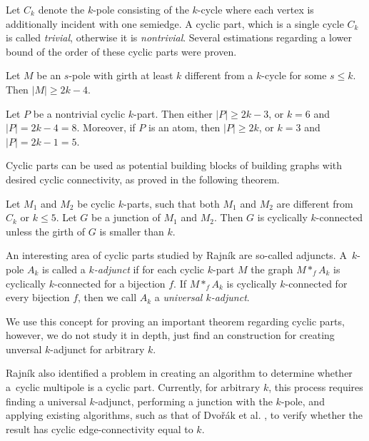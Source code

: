 \documentclass[12pt, twoside]{book}
\begin{document}
Let $C_k$ denote the $k$-pole consisting of the $k$-cycle where each vertex is additionally incident with one semiedge. A cyclic part, which is a single cycle $C_k$ is called \textit{trivial}, otherwise it is \textit{nontrivial}. Several estimations regarding a lower bound of the order of these cyclic parts were proven.

\begin{lemma}\label{lem:rajnik5.1}
	Let $M$ be an $s$-pole with girth at least $k$ different from a $k$-cycle for some $s\leq k$. Then $|M| \geq 2k - 4$.
\end{lemma}

\begin{theorem}
	Let $P$ be a nontrivial cyclic $k$-part. Then either $|P|\geq 2k-3$, or $k = 6$ and $|P|= 2k-4 = 8$. Moreover, if $P$ is an atom, then $|P| \geq 2k$, or $k = 3$ and $|P| = 2k-1 = 5$.
\end{theorem}

Cyclic parts can be used as potential building blocks of building graphs with desired cyclic connectivity, as proved in the following theorem.

\begin{theorem}
	Let $M_1$ and $M_2$ be cyclic $k$-parts, such that both $M_1$ and $M_2$ are diﬀerent from $C_k$ or $k\leq 5$. Let $G$ be a junction of $M_1$ and $M_2$. Then $G$ is cyclically $k$-connected unless the girth of $G$ is smaller than $k$.
\end{theorem}

An interesting area of cyclic parts studied by Rajník \cite{Rajnik_phd} are so-called adjuncts. A~$k$-pole $A_k$ is called a \textit{$k$-adjunct} if for each cyclic $k$-part $M$ the graph $M*_f A_k$ is cyclically $k$-connected for a bijection $f$. If $M*_f A_k$ is cyclically $k$-connected for every bijection $f$, then we call $A_k$ a \emph{universal $k$-adjunct}.

We use this concept for proving an important theorem regarding cyclic parts, however, we do not study it in depth, just find an construction for creating unversal $k$-adjunct for arbitrary $k$.

Rajník \cite{Rajnik_phd} also identified a problem in creating an algorithm to determine whether a~cyclic multipole is a cyclic part. Currently, for arbitrary $k$, this process requires finding a universal $k$-adjunct, performing a junction with the $k$-pole, and applying existing algorithms, such as that of Dvořák et al. \cite{Dvorak2004}, to verify whether the result has cyclic edge-connectivity equal to $k$.
\end{document}
